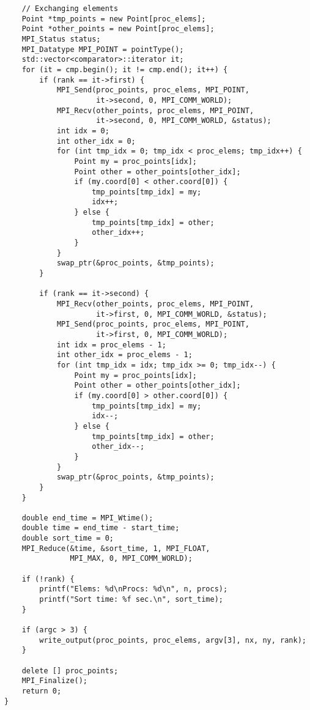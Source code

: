 \documentclass[oneside,final,14pt]{extreport}
\begin{document}
\begin{verbatim}
    // Exchanging elements
    Point *tmp_points = new Point[proc_elems];
    Point *other_points = new Point[proc_elems];
    MPI_Status status;
    MPI_Datatype MPI_POINT = pointType();
    std::vector<comparator>::iterator it;
    for (it = cmp.begin(); it != cmp.end(); it++) {
        if (rank == it->first) {
            MPI_Send(proc_points, proc_elems, MPI_POINT,
                     it->second, 0, MPI_COMM_WORLD);
            MPI_Recv(other_points, proc_elems, MPI_POINT,
                     it->second, 0, MPI_COMM_WORLD, &status);
            int idx = 0;
            int other_idx = 0;
            for (int tmp_idx = 0; tmp_idx < proc_elems; tmp_idx++) {
                Point my = proc_points[idx];
                Point other = other_points[other_idx];
                if (my.coord[0] < other.coord[0]) {
                    tmp_points[tmp_idx] = my;
                    idx++;
                } else {
                    tmp_points[tmp_idx] = other;
                    other_idx++;
                }
            }
            swap_ptr(&proc_points, &tmp_points);
        }

        if (rank == it->second) {
            MPI_Recv(other_points, proc_elems, MPI_POINT,
                     it->first, 0, MPI_COMM_WORLD, &status);
            MPI_Send(proc_points, proc_elems, MPI_POINT,
                     it->first, 0, MPI_COMM_WORLD);
            int idx = proc_elems - 1;
            int other_idx = proc_elems - 1;
            for (int tmp_idx = idx; tmp_idx >= 0; tmp_idx--) {
                Point my = proc_points[idx];
                Point other = other_points[other_idx];
                if (my.coord[0] > other.coord[0]) {
                    tmp_points[tmp_idx] = my;
                    idx--;
                } else {
                    tmp_points[tmp_idx] = other;
                    other_idx--;
                }
            }
            swap_ptr(&proc_points, &tmp_points);
        }
    }

    double end_time = MPI_Wtime();
    double time = end_time - start_time;
    double sort_time = 0;
    MPI_Reduce(&time, &sort_time, 1, MPI_FLOAT,
               MPI_MAX, 0, MPI_COMM_WORLD);

    if (!rank) {
        printf("Elems: %d\nProcs: %d\n", n, procs);
        printf("Sort time: %f sec.\n", sort_time);
    }

    if (argc > 3) {
        write_output(proc_points, proc_elems, argv[3], nx, ny, rank);
    }

    delete [] proc_points;
    MPI_Finalize();
    return 0;
}

\end{verbatim}
\end{document}
